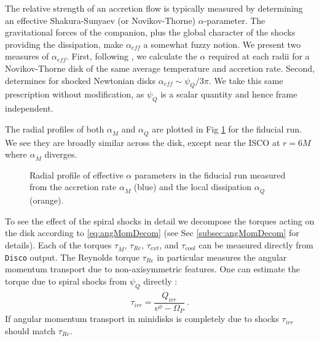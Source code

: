 \documentclass{emulateapj}
\newcommand{\al}{\alpha}
\newcommand{\Om}{\Omega}
\newcommand{\Disco}{{\texttt{Disco}}}
\begin{document}
The relative strength of an accretion flow is typically measured by determining an effective Shakura-Sunyaev (or Novikov-Thorne) $\al$-parameter.  The gravitational forces of the companion, plus the global character of the shocks providing the dissipation, make $\al_{eff}$ a somewhat fuzzy notion.  We present two measures of $\al_{eff}$.  First, following \cite{Ju16}, we calculate the $\al$ required at each radii for a Novikov-Thorne disk of the same average temperature and accretion rate.  Second, \cite{Rafikov16} determines for shocked Newtonian disks $\al_{eff} \sim \psi_Q / 3\pi$.  We take this same prescription without modification, as $\psi_Q$ is a scalar quantity and hence frame independent.  

The radial profiles of both $\al_{\dot{M}}$ and $\al_{\dot{Q}}$ are plotted in Fig \ref{fi:alpha} for the fiducial run.  We see they are broadly similar across the disk, except near the ISCO at $r=6M$ where $\al_{\dot{M}}$ diverges.  

\begin{figure}
\caption{\label{fi:alpha} Radial profile of effective $\al$ parameters in the fiducial run measured from the accretion rate $\al_{\dot{M}}$ (blue) and the local dissipation $\al_{\dot{Q}}$ (orange).}
\end{figure}

To see the effect of the spiral shocks in detail we decompose the torques acting on the disk according to \eqref{eq:angMomDecom} (see Sec \ref{subsec:angMomDecom} for details). Each of the torques $\tau_{\dot{M}}$, $\tau_{Re}$, $\tau_{ext}$, and $\tau_{cool}$ can be measured directly from \Disco{} output.  The Reynolds torque $\tau_{Re}$ in particular measures the angular momentum transport due to non-axisymmetric features.  One can estimate the torque due to spiral shocks from $\psi_Q$ directly \citep{Rafikov16}:
\begin{equation}
	\tau_{irr} = \frac{\dot{Q}_{irr}}{v^\phi - \Om_P} \ . \label{eq:tauRaf}
\end{equation}
If angular momentum transport in minidisks is completely due to shocks $\tau_{irr}$ should match $\tau_{Re}$.
\end{document}
